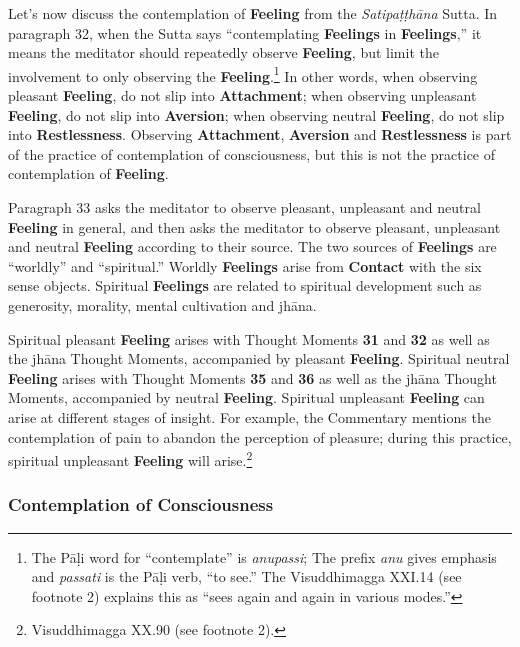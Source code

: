 Let’s now discuss the contemplation of \textbf{Feeling} from the \textit{Satipaṭṭhāna} Sutta. In paragraph 32, when the Sutta says “contemplating \textbf{Feelings} in \textbf{Feelings},” it means the meditator should repeatedly observe \textbf{Feeling}, but limit the involvement to only observing the \textbf{Feeling}.\footnote{The Pāḷi word for “contemplate” is \textit{anupassi}; The prefix \textit{anu} gives emphasis and \textit{passati} is the Pāḷi verb, “to see.” The Visuddhimagga XXI.14 (see footnote 2) explains this as “sees again and again in various modes.”} In other words, when observing pleasant \textbf{Feeling}, do not slip into \textbf{Attachment}; when observing unpleasant \textbf{Feeling}, do not slip into \textbf{Aversion}; when observing neutral \textbf{Feeling}, do not slip into \textbf{Restlessness}. Observing \textbf{Attachment}, \textbf{Aversion} and \textbf{Restlessness} is part of the practice of contemplation of consciousness, but this is not the practice of contemplation of \textbf{Feeling}.

Paragraph 33 asks the meditator to observe pleasant, unpleasant and neutral \textbf{Feeling} in general, and then asks the meditator to observe pleasant, unpleasant and neutral \textbf{Feeling} according to their source. The two sources of \textbf{Feelings} are “worldly” and “spiritual.” Worldly \textbf{Feelings} arise from \textbf{Contact} with the six sense objects. Spiritual \textbf{Feelings} are related to spiritual development such as generosity, morality, mental cultivation and jhāna.

Spiritual pleasant \textbf{Feeling} arises with Thought Moments \textbf{31} and \textbf{32} as well as the jhāna Thought Moments, accompanied by pleasant \textbf{Feeling}. Spiritual neutral \textbf{Feeling} arises with Thought Moments \textbf{35} and \textbf{36} as well as the jhāna Thought Moments, accompanied by neutral \textbf{Feeling}. Spiritual unpleasant \textbf{Feeling} can arise at different stages of insight. For example, the Commentary mentions the contemplation of pain to abandon the perception of pleasure; during this practice, spiritual unpleasant \textbf{Feeling} will arise.\footnote{Visuddhimagga XX.90 (see footnote 2).}

\subsubsection*{Contemplation of Consciousness}


